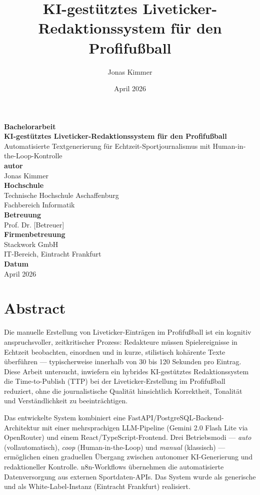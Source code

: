 \documentclass[12pt,a4paper,notitlepage,ngerman]{report}
\title{KI-gestütztes Liveticker-Redaktionssystem für den Profifußball}
\author{Jonas Kimmer}
\date{April 2026}
\begin{document}
\begin{titlepage}
\centering
\vspace*{2cm}
{\Large \textbf{Bachelorarbeit}}\\[2cm]
{\LARGE \textbf{KI-gestütztes Liveticker-Redaktionssystem für den Profifußball}}\\[0.5cm]
{\large Automatisierte Textgenerierung für Echtzeit-Sportjournalismus mit Human-in-the-Loop-Kontrolle}\\[3cm]
{\large \textbf{autor}}\\
Jonas Kimmer\\[3cm]
{\large \textbf{Hochschule}}\\
Technische Hochschule Aschaffenburg\\[0.5cm]
Fachbereich Informatik\\[2cm]
{\large \textbf{Betreuung}}\\
Prof. Dr. [Betreuer]\\[3cm]
{\large \textbf{Firmenbetreuung}}\\
Stackwork GmbH\\
IT-Bereich, Eintracht Frankfurt\\[3cm]
{\large \textbf{Datum}}\\
April 2026
\end{titlepage}

\chapter*{Abstract}

Die manuelle Erstellung von Liveticker-Einträgen im Profifußball ist ein kognitiv anspruchsvoller, zeitkritischer Prozess: Redakteure müssen Spielereignisse in Echtzeit beobachten, einordnen und in kurze, stilistisch kohärente Texte überführen — typischerweise innerhalb von 30 bis 120 Sekunden pro Eintrag. Diese Arbeit untersucht, inwiefern ein hybrides KI-gestütztes Redaktionssystem die Time-to-Publish (TTP) bei der Liveticker-Erstellung im Profifußball reduziert, ohne die journalistische Qualität hinsichtlich Korrektheit, Tonalität und Verständlichkeit zu beeinträchtigen.

Das entwickelte System kombiniert eine FastAPI/PostgreSQL-Backend-Architektur mit einer mehrsprachigen LLM-Pipeline (Gemini 2.0 Flash Lite via OpenRouter) und einem React/TypeScript-Frontend. Drei Betriebsmodi — \textit{auto} (vollautomatisch), \textit{coop} (Human-in-the-Loop) und \textit{manual} (klassisch) — ermöglichen einen graduellen Übergang zwischen autonomer KI-Generierung und redaktioneller Kontrolle. n8n-Workflows übernehmen die automatisierte Datenversorgung aus externen Sportdaten-APIs. Das System wurde als generische und als White-Label-Instanz (Eintracht Frankfurt) realisiert.
\end{document}
